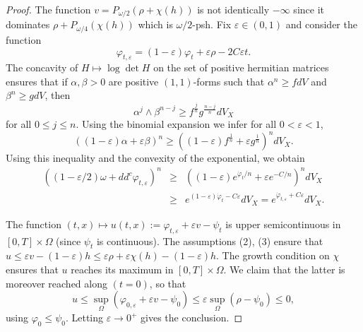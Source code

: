 \documentclass[11pt]{amsart}
\numberwithin{equation}{section}
\newcommand{\f}{\varphi}
\newcommand \e {\varepsilon}
\begin{document}
\begin{proof}
The function  $v=P_{\omega/2}(\rho +\chi(h))$ is not identically $-\infty$ since it dominates 
$\rho + P_{\omega/4} (\chi(h))$ which is $\omega/2$-psh. 
Fix $\varepsilon\in (0,1)$ and consider the function 
\[
\varphi_{t,\varepsilon} =  (1-\varepsilon) \varphi_t+\varepsilon \rho-2C\varepsilon t. 
\]
The concavity of $H \mapsto \log \det H$ on the set of positive hermitian matrices 
ensures that if $\alpha,\beta >0$ are positive $(1,1)$-forms such that
$\alpha^n \geq f dV$ and $\beta^n \geq g dV$, then 
$$
\alpha^j \wedge \beta^{n-j} \geq f^{\frac{j}{n}} g^{\frac{n-j}{n}} dV_X
$$
for all $0 \leq j \leq n$. Using the binomial expansion we infer for all $0<\e<1$,
$$
((1-\e) \alpha+\e \beta)^n \geq \left( (1-\e) f^{\frac{1}{n}} +\e g^{\frac{1}{n}} \right)^n dV_X.
$$
Using this inequality and the convexity of  the exponential, we obtain
\begin{eqnarray*}
((1-\varepsilon/2)\omega + dd^c \varphi_{t,\varepsilon})^n  
&\geq & \left((1-\varepsilon) e^{\dot \varphi_t/n} + \varepsilon  e^{-C/n}\right)^ndV_X\\
&\geq &  e^{(1-\varepsilon) \dot \varphi_t -C\varepsilon }dV_X= e^{\dot{\varphi}_{t,\varepsilon}+C\varepsilon}dV_X.
\end{eqnarray*}
 

The function $(t,x) \mapsto u(t,x):= \varphi_{t,\varepsilon}+ \varepsilon v -\psi_{t}$
 is upper semicontinuous in $[0,T]\times \Omega$ (since $\psi_t$ is continuous).
 The assumptions (2), (3) ensure that $u\leq \varepsilon v-(1-\varepsilon)h \leq \varepsilon \rho + \varepsilon \chi(h)-(1-\varepsilon)h $. The growth condition on $\chi$ ensures that $u$ reaches its maximum in $[0,T]\times \Omega$.
  We claim that the latter is moreover reached
 along $(t=0)$, so that 
 $$
 u \leq \sup_{\Omega} (\f_{0,\e}+\varepsilon v -\psi_0) \leq \varepsilon \sup_{\Omega} (\rho-\psi_0) \leq 0,
 $$
using $\varphi_0\leq \psi_0$.
 Letting $\varepsilon \to 0^+$ gives the conclusion. 
 
 \smallskip
 

\end{proof}
\end{document}
